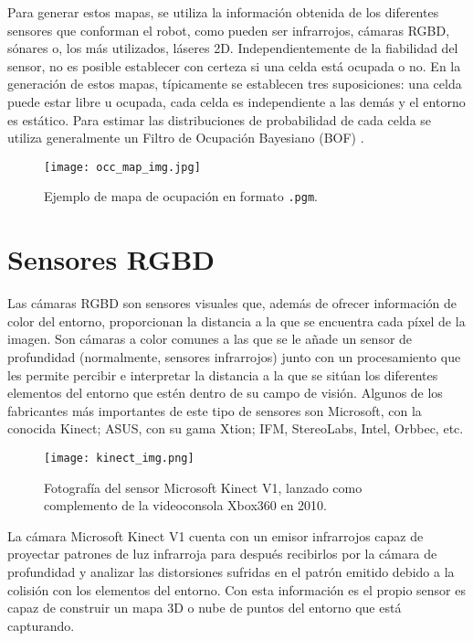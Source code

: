 Para generar estos mapas, se utiliza la información obtenida de los diferentes sensores que conforman el robot, como pueden ser infrarrojos, cámaras RGBD, sónares o, los más utilizados, láseres 2D. Independientemente de la fiabilidad del sensor, no es posible establecer con certeza si una celda está ocupada o no. En la generación de estos mapas, típicamente se establecen tres suposiciones: una celda puede estar libre u ocupada, cada celda es independiente a las demás y el entorno es estático. Para estimar las distribuciones de probabilidad de cada celda se utiliza generalmente un Filtro de Ocupación Bayesiano (BOF) \cite{occupancy_grid}.\\

\begin{figure}[h]
\begin{center} \label{fig:occ_map}
\texttt{[image: occ\_map\_img.jpg]}
\end{center}
\caption{Ejemplo de mapa de ocupación en formato \texttt{.pgm}.}
\end{figure}

\section{Sensores RGBD}

Las cámaras RGBD son sensores visuales que, además de ofrecer información de color del entorno, proporcionan la distancia a la que se encuentra cada píxel de la imagen. Son cámaras a color comunes a las que se le añade un sensor de profundidad (normalmente, sensores infrarrojos) junto con un procesamiento que les permite percibir e interpretar la distancia a la que se sitúan los diferentes elementos del entorno que estén dentro de su campo de visión. Algunos de los fabricantes más importantes de este tipo de sensores son Microsoft, con la conocida Kinect; ASUS, con su gama Xtion; IFM, StereoLabs, Intel, Orbbec, etc.\\

\begin{figure}[h]
	\begin{center} 
		\texttt{[image: kinect\_img.png]}
	\end{center}
	\caption{Fotografía del sensor Microsoft Kinect V1, lanzado como complemento de la videoconsola Xbox360 en 2010. \cite{kinectv1}}
	\label{fig:kinect}
\end{figure}

La cámara Microsoft Kinect V1 cuenta con un emisor infrarrojos capaz de proyectar patrones de luz infrarroja para después recibirlos por la cámara de profundidad y analizar las distorsiones sufridas en el patrón emitido debido a la colisión con los elementos del entorno. Con esta información es el propio sensor es capaz de construir un mapa 3D o nube de puntos del entorno que está capturando.\\


